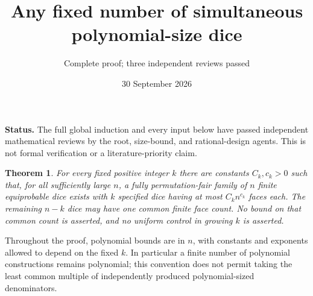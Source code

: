 \documentclass[11pt]{article}
\title{Any fixed number of simultaneous polynomial-size dice}
\author{Complete proof; three independent reviews passed}\date{30 September 2026}
\newtheorem{theorem}{Theorem}\newtheorem{lemma}{Lemma}
\begin{document}
\maketitle
\noindent\textbf{Status.} The full global induction and every input below
have passed independent mathematical reviews by the root, size-bound,
and rational-design agents. This is not formal verification or a
literature-priority claim.

\begin{theorem}\label{main}
For every fixed positive integer $k$ there are constants $C_k,c_k>0$
such that, for all sufficiently large $n$, a fully permutation-fair
family of $n$ finite equiprobable dice exists with $k$ specified dice
having at most $C_k n^{c_k}$ faces each. The remaining $n-k$ dice may
have one common finite face count. No bound on that common count is
asserted, and no uniform control in growing $k$ is asserted.
\end{theorem}

Throughout the proof, polynomial bounds are in $n$, with constants and
exponents allowed to depend on the fixed $k$. In particular a finite
number of polynomial constructions remains polynomial; this convention
does not permit taking the least common multiple of independently
produced polynomial-sized denominators.
\end{document}
